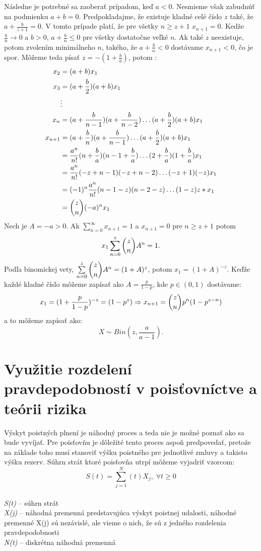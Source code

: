 \documentclass[a4paper,10pt]{article}
\theoremstyle{plain}
\theoremstyle{definition}
\begin{document}
Následne je potrebné sa zaoberať prípadom, keď $ a<0 $. Nesmieme však zabudnúť na podmienku $ a+b=0 $.
Predpokladajme, že existuje kladné celé číslo $ z $ také, že $ a + \frac{b}{z+1} = 0 $. V tomto prípade
platí, že pre všetky $ n\geq z+1  $ $ x_{n+1} = 0 $.
Kedže $ \frac{b}{n} \rightarrow 0$ a $ b>0 $, $a + \frac{b}{n} \leq 0$ pre všetky dostatočne veľké $ n $. Ak také $ z $ neexistuje, potom zvolením minimálneho $ n $, takého, že $ a + \frac{b}{n} < 0 $ dostávame $ x_{n+1}<0 $, čo je spor.
Môžeme teda písať $ z = -(1+\frac{b}{a}) $, potom :
\begin{align*}
x_{2}&=(a+b)\*x_{1} \\
x_{3}&=(a + \frac{b}{2}) \* (a + b)\*x_{1}\\
&\vdots \\
x_{n} &= (a+\frac{b}{n-1})\*(a+\frac{b}{n-2})\ldots  (a + \frac{b}{2})\*(a+b)\*x_{1}\\
x_{n+1} &= (a + \frac{b}{n})\*(a + \frac{b}{n-1})\ldots (a + \frac{b}{2})\*(a+b)\*x_{1}\\
&= \frac{a^{n}}{n!}\*(n + \frac{b}{a})\*(n-1+\frac{b}{a}) \ldots (2+\frac{b}{a})\*(1+\frac{b}{a})\*x_{1} \\
&= \frac{a^{n}}{n!}\*(-z+n-1)\*(-z+n-2) \ldots (-z+1)\*(-z)\*x_{1} \\
&= (-1)^{n}\*\frac{a^{n}}{n!}\*(n-1-z)\*(n-2-z)\ldots(1-z)\*z*x_{1} \\
&= \dbinom{z}{n}\*(-a)^{n}\*x_{1}  \\
\end{align*}\newpage
\noindent Nech je $ A = -a >0 $. Ak $ \sum\limits_{n=0}^\infty x_{n+1} = 1 $ a $ x_{n+1} = 0 $ pre $ n\geq z+1 $ potom 
$$ x_{1} \sum\limits_{n=0}^z \dbinom{z}{n} A^{n}= 1 \text{.}$$
\noindent Podľa binomickej vety, $ \sum\limits_{n=0}^z \dbinom{z}{n} A^{n}= (1+A)^{z} $, potom $ x_{1} = (1+A)^{-z} $.
Keďže každé kladné číslo môžeme zapísať ako $ A = \frac{p}{1-p} $, kde $ p \in (0,1) $ dostávame: 
$$ x_{1} = (1 + \frac{p}{1-p})^{-z} = (1-p^{z}) \Rightarrow x_{n+1} = \dbinom{z}{n}\*p^{n}\*(1-p^{z-n}) $$ a to 
môžeme zapísať ako: $$ X \sim Bin(z,\frac{a}{a-1}) \text{.}$$%
\newpage %
\section{Využitie rozdelení pravdepodobností v poisťovníctve a teórii rizika} %
Výskyt poistných plnení je náhodný proces a teda nie je možné poznať ako sa bude vyvíjať. Pre poisťovňu je dôležité tento proces aspoň predpovedať, pretože na základe toho musí stanoviť výšku poistného pre jednotlivé zmluvy a takisto výšku rezerv. 
Súhrn strát ktoré poisťovňa utrpí môžeme vyjadriť vzorcom:
$$ S(t) = \sum\limits_{j=1}^N(t) X_{j},\; \forall t\geq0 $$\\
\textit{S(t)} – súhrn strát \\
\textit{X(j)} – náhodná premenná predstavujúca výskyt poistnej udalosti, náhodné premenné X(j) sú nezávislé, ale vieme o nich, že sú  z jedného rozdelenia pravdepodobnosti\\
\textit{N(t)} – diskrétna náhodná premenná\\
\end{document}
